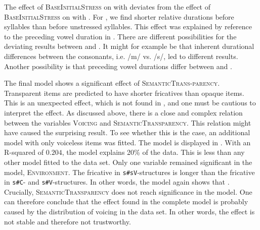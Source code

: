 The effect of \textsc{BaseInitialStress} on  with  deviates from the effect of \textsc{BaseInitialStress} on  with . For , we find shorter relative durations before  syllables than before unstressed syllables. This effect was explained by reference to the preceding vowel duration in . There are different possibilities for the deviating results between  and . It might for example be that inherent durational differences between the consonants, i.e. /m/ vs. /s/, led to different results. Another possibility is that preceding vowel durations differ between  and .
          

 The final  model shows a significant effect of \textsc{SemanticTrans-parency}. Transparent items are predicted to have shorter fricatives than opaque items. This is an unexpected effect, which is not found in , and one must be cautious to interpret the effect. 
 As discussed above, there is a close and complex relation between the variables \textsc{Voicing} and \textsc{SemanticTransparency}. This relation might have caused the surprising result. To see whether this is the case, an additional model with only voiceless items was fitted. The model is displayed in .
 With an R-squared of $0.204$, the model explains 20\% of the data. This is less than any other model fitted to the data set. Only one variable remained significant in the model, \textsc{Environment}. The fricative in \texttt{s\#sV}-structures is longer than the fricative in \texttt{s\#C}- and \texttt{s\#V}-structures. In other words, the model again shows that  . 
 Crucially, \textsc{SemanticTransparency} does not reach significance in the model. One can therefore conclude that the effect found in the complete model is probably caused by the distribution of voicing in the data set. In other words, the effect is not stable and therefore not trustworthy.

